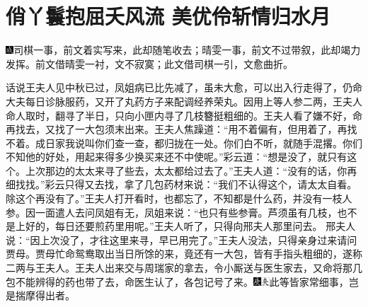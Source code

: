 
\chapter{俏丫鬟抱屈夭风流 美优伶斩情归水月}

{\includegraphics[width=3mm]{../Images/00005}\kaishu 司棋一事，前文着实写来，此却随笔收去；晴雯一事，前文不过带叙，此却竭力发挥。前文借晴雯一衬，文不寂寞；此文借司棋一引，文愈曲折。}

话说王夫人见中秋已过，凤姐病已比先减了，虽未大愈，可以出入行走得了，仍命大夫每日诊脉服药，又开了丸药方子来配调经养荣丸。因用上等人参二两，王夫人命人取时，翻寻了半日，只向小匣内寻了几枝簪挺粗细的。王夫人看了嫌不好，命再找去，又找了一大包须末出来。王夫人焦躁道：``用不着偏有，但用着了，再找不着。成日家我说叫你们查一查，都归拢在一处。你们白不听，就随手混撂。你们不知他的好处，用起来得多少换买来还不中使呢。''彩云道：``想是没了，就只有这个。上次那边的太太来寻了些去，太太都给过去了。''王夫人道：``没有的话，你再细找找。''彩云只得又去找，拿了几包药材来说：``我们不认得这个，请太太自看。除这个再没有了。''王夫人打开看时，也都忘了，不知都是什么药，并没有一枝人参。因一面遣人去问凤姐有无，凤姐来说：``也只有些参膏。芦须虽有几枝，也不是上好的，每日还要煎药里用呢。''王夫人听了，只得向邢夫人那里问去。
邢夫人说：``因上次没了，才往这里来寻，早已用完了。''王夫人没法，只得亲身过来请问贾母。贾母忙命鸳鸯取出当日所馀的来，竟还有一大包，皆有手指头粗细的，遂称二两与王夫人。王夫人出来交与周瑞家的拿去，令小厮送与医生家去，又命将那几包不能辨得的药也带了去，命医生认了，各包记号了来。{\includegraphics[width=3mm]{../Images/00004}\includegraphics[width=3mm]{../Images/00012}\footnotesize \kaishu 此等皆家常细事，岂是揣摩得出者。}

